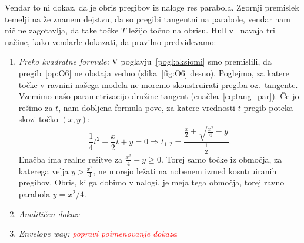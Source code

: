 Vendar to ni dokaz, da je obris pregibov iz naloge res parabola. Zgornji premislek temelji na že znanem dejstvu, da so pregibi tangentni na parabole, vendar nam nič ne zagotavlja, da take točke $T$ ležijo točno na obrisu. Hull v~\cite[str.\ 55--56]{hull2013} navaja tri načine, kako vendarle dokazati, da pravilno predvidevamo:

\begin{enumerate}
    \item \textit{Preko kvadratne formule:} V poglavju~\ref{pogl:aksiomi} smo premislili, da pregib~\ref{op:O6} ne obstaja vedno (slika~\ref{fig:O6} desno).
    Poglejmo, za katere točke v ravnini našega modela ne moremo skonstruirati pregiba oz.\ tangente. Vzemimo našo parametrizacijo družine tangent (enačba~\ref{eq:tang_par}). Če jo rešimo za $t$, nam dobljena formula pove, za katere vrednosti $t$ pregib poteka skozi točko $(x, y)$:
    $$ \frac{1}{4}t^2 - \frac{x}{2}t + y = 0 \Longrightarrow t_{1,2} = \frac{\frac{x}{2} \pm \sqrt{\frac{x^2}{4} - y}}{\frac{1}{2}}.$$
    Enačba ima realne rešitve za $\frac{x^2}{4} - y \geq 0$. Torej samo točke iz območja, za katerega velja $y > \frac{x^2}{4}$, ne morejo ležati na nobenem izmed kosntruiranih pregibov. Obris, ki ga dobimo v nalogi, je meja tega območja, torej ravno parabola $y = x^2/4$.
    \item \textit{Analitičen dokaz: }
    \item \textit{Envelope way: \textcolor{red}{popravi poimenovanje dokaza}}
\end{enumerate}
